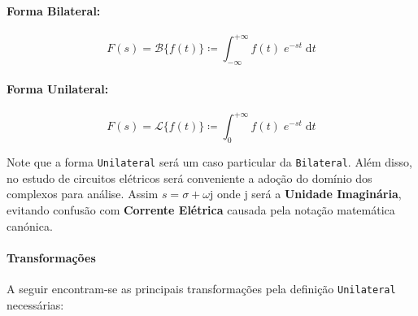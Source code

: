 \documentclass{article}
\begin{document}
            \begin{multicols}{2}
                \raggedcolumns
                \paragraph{Forma Bilateral:}
                    \begin{equation}
                        \boxed{
                            F(s) = \mathcal{B}\{ f(t) \} \coloneqq \int_{-\infty}^{+\infty} f(t) \; e^{-st} \; \text{d} t
                        }
                    \end{equation}

                \columnbreak

                \paragraph{Forma Unilateral:}
                    \begin{equation}
                        \boxed{
                            F(s) = \mathcal{L}\{ f(t) \} \coloneqq \int_{0}^{+\infty} f(t) \; e^{-st} \; \text{d} t
                        }
                    \end{equation}
            \end{multicols}\noindent
            Note que a forma \texttt{Unilateral} será um caso particular da \texttt{Bilateral}. Além disso, no estudo de circuitos elétricos será conveniente a adoção do domínio dos complexos para análise. Assim $s = \sigma + \omega\text{j}$ onde $\text{j}$ será a \textbf{Unidade Imaginária}, evitando confusão com \textbf{Corrente Elétrica} causada pela notação matemática canónica.

            \paragraph{Transformações}A seguir encontram-se as principais transformações pela definição \texttt{Unilateral} necessárias:
\end{document}
